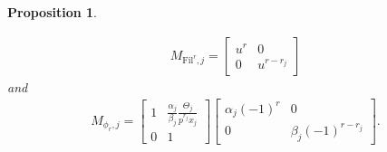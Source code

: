 \documentclass[11pt]{amsart}
\theoremstyle{definition}
\numberwithin{equation}{subsection}
\theoremstyle{plain}
\theoremstyle{plain}
\theoremstyle{plain}
\theoremstyle{plain}
\theoremstyle{plain}
\theoremstyle{plain}
\theoremstyle{plain}
\theoremstyle{plain}
\newtheorem{prop}[equation]{Proposition}
\theoremstyle{plain}
\theoremstyle{plain}
\theoremstyle{plain}
\theoremstyle{plain}
\theoremstyle{definition}
\theoremstyle{definition}
\theoremstyle{definition}
\theoremstyle{remark}
\renewcommand{\(}{\textup{(}}
\renewcommand{\)}{\textup{)}}
\newcommand{\Fil}{\mathrm{Fil}}
\begin{document}
\begin{prop}
\begin{enumerate}[leftmargin=*]
\begin{align*}
    M_{\Fil^r,j}
        =
        \begin{bmatrix}
            u^r & 0 \\
            0 & u^{r-r_j}
        \end{bmatrix}
    \end{align*}
    and
    \begin{align*}
    M_{\phi_r,j}
        =
        \begin{bmatrix}
          1 & \frac{\alpha_j}{\beta_j}\frac{\Theta_j}{p^{r_j}x_j} \\
          0 & 1
        \end{bmatrix}
        \begin{bmatrix}
            \alpha_j (-1)^r & 0 \\
            0 & \beta_j (-1)^{r-r_j}
        \end{bmatrix}.
    \end{align*}
\end{enumerate}
\end{prop}
\end{document}
